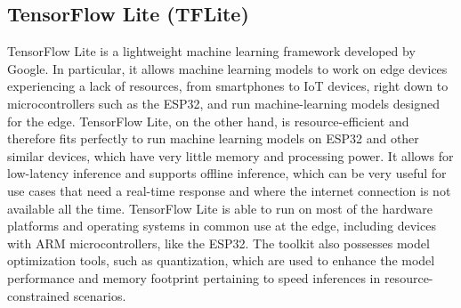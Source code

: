 \documentclass[a4paper]{report}
\begin{document}
{\begin{center}
\end{center}
\subsection{TensorFlow Lite (TFLite)}
TensorFlow Lite is a lightweight machine learning framework developed by Google. In particular, it allows machine learning models to work on edge devices experiencing a lack of resources, from smartphones to IoT devices, right down to microcontrollers such as the ESP32, and run machine-learning models designed for the edge. TensorFlow Lite, on the other hand, is resource-efficient and therefore fits perfectly to run machine learning models on ESP32 and other similar devices, which have very little memory and processing power. It allows for low-latency inference and supports offline inference, which can be very useful for use cases that need a real-time response and where the internet connection is not available all the time. TensorFlow Lite is able to run on most of the hardware platforms and operating systems in common use at the edge, including devices with ARM microcontrollers, like the ESP32. The toolkit also possesses model optimization tools, such as quantization, which are used to enhance the model performance and memory footprint pertaining to speed inferences in resource-constrained scenarios.\\

}
\end{document}
